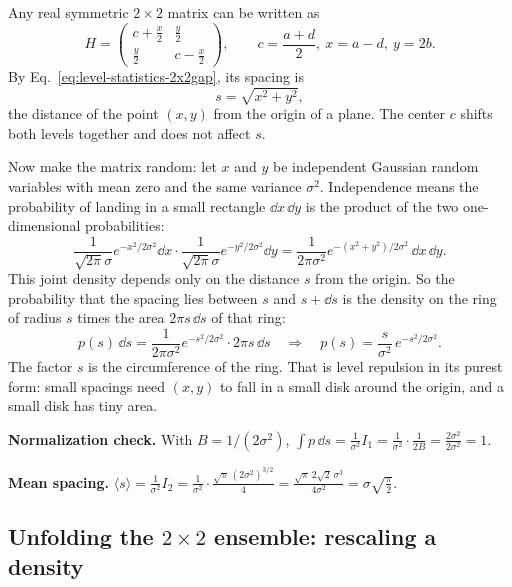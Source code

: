 Any real symmetric $2\times2$ matrix can be written as
\begin{equation}
H=\begin{pmatrix} c+\tfrac x2 & \tfrac y2\\[2pt] \tfrac y2 & c-\tfrac x2\end{pmatrix},
\qquad c=\frac{a+d}{2},\ x=a-d,\ y=2b .
\label{eq:level-statistics-param}
\end{equation}
By Eq.~\eqref{eq:level-statistics-2x2gap}, its spacing is
\begin{equation}
s=\sqrt{x^2+y^2},
\end{equation}
the distance of the point $(x,y)$ from the origin of a plane. The center $c$ shifts both levels together and does not affect $s$.

Now make the matrix random: let $x$ and $y$ be independent Gaussian random variables with mean zero and the same variance $\sigma^2$. Independence means the probability of landing in a small rectangle $\dd x\,\dd y$ is the product of the two one-dimensional probabilities:
\begin{equation}
\frac{1}{\sqrt{2\pi}\sigma}e^{-x^2/2\sigma^2}\dd x\cdot\frac{1}{\sqrt{2\pi}\sigma}e^{-y^2/2\sigma^2}\dd y
=\frac{1}{2\pi\sigma^2}e^{-(x^2+y^2)/2\sigma^2}\,\dd x\,\dd y .
\end{equation}
This joint density depends only on the distance $s$ from the origin. So the probability that the spacing lies between $s$ and $s+\dd s$ is the density on the ring of radius $s$ times the area $2\pi s\,\dd s$ of that ring:
\begin{equation}
p(s)\,\dd s=\frac{1}{2\pi\sigma^2}e^{-s^2/2\sigma^2}\cdot 2\pi s\,\dd s
\quad\Longrightarrow\quad
p(s)=\frac{s}{\sigma^2}\,e^{-s^2/2\sigma^2}.
\label{eq:level-statistics-rayleigh}
\end{equation}
The factor $s$ is the circumference of the ring. That is level repulsion in its purest form: small spacings need $(x,y)$ to fall in a small disk around the origin, and a small disk has tiny area.

\textbf{Normalization check.} With $B=1/(2\sigma^2)$, $\int p\,\dd s=\frac{1}{\sigma^2}I_1=\frac{1}{\sigma^2}\cdot\frac{1}{2B}=\frac{2\sigma^2}{2\sigma^2}=1$.

\textbf{Mean spacing.} $\langle s\rangle=\frac{1}{\sigma^2}I_2=\frac{1}{\sigma^2}\cdot\frac{\sqrt\pi\,(2\sigma^2)^{3/2}}{4}=\frac{\sqrt\pi\,2\sqrt2\,\sigma^3}{4\sigma^2}=\sigma\sqrt{\frac{\pi}{2}}$.

\subsection{Unfolding the $2\times2$ ensemble: rescaling a density}

